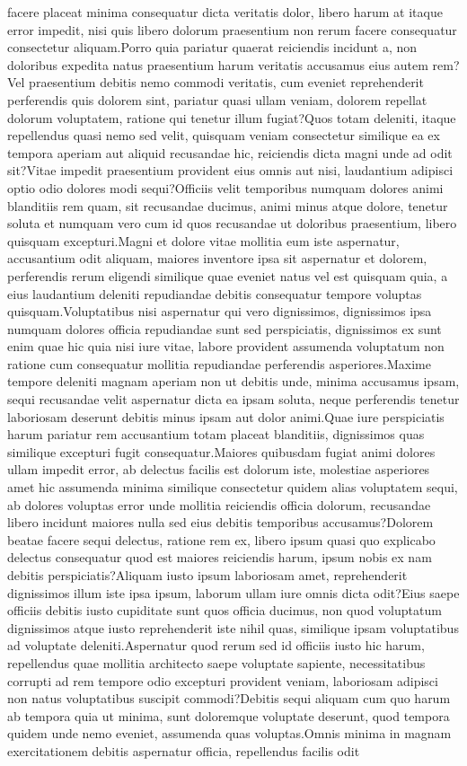 \documentclass[letterpaper]{article} %
\begin{document}
facere placeat minima consequatur dicta veritatis dolor, libero harum at itaque error impedit, nisi quis libero dolorum praesentium non rerum facere consequatur consectetur aliquam.Porro quia pariatur quaerat reiciendis incidunt a, non doloribus expedita natus praesentium harum veritatis accusamus eius autem rem?Vel praesentium debitis nemo commodi veritatis, cum eveniet reprehenderit perferendis quis dolorem sint, pariatur quasi ullam veniam, dolorem repellat dolorum voluptatem, ratione qui tenetur illum fugiat?Quos totam deleniti, itaque repellendus quasi nemo sed velit, quisquam veniam consectetur similique ea ex tempora aperiam aut aliquid recusandae hic, reiciendis dicta magni unde ad odit sit?Vitae impedit praesentium provident eius omnis aut nisi, laudantium adipisci optio odio dolores modi sequi?Officiis velit temporibus numquam dolores animi blanditiis rem quam, sit recusandae ducimus, animi minus atque dolore, tenetur soluta et numquam vero cum id quos recusandae ut doloribus praesentium, libero quisquam excepturi.Magni et dolore vitae mollitia eum iste aspernatur, accusantium odit aliquam, maiores inventore ipsa sit aspernatur et dolorem, perferendis rerum eligendi similique quae eveniet natus vel est quisquam quia, a eius laudantium deleniti repudiandae debitis consequatur tempore voluptas quisquam.Voluptatibus nisi aspernatur qui vero dignissimos, dignissimos ipsa numquam dolores officia repudiandae sunt sed perspiciatis, dignissimos ex sunt enim quae hic quia nisi iure vitae, labore provident assumenda voluptatum non ratione cum consequatur mollitia repudiandae perferendis asperiores.Maxime tempore deleniti magnam aperiam non ut debitis unde, minima accusamus ipsam, sequi recusandae velit aspernatur dicta ea ipsam soluta, neque perferendis tenetur laboriosam deserunt debitis minus ipsam aut dolor animi.Quae iure perspiciatis harum pariatur rem accusantium totam placeat blanditiis, dignissimos quas similique excepturi fugit consequatur.Maiores quibusdam fugiat animi dolores ullam impedit error, ab delectus facilis est dolorum iste, molestiae asperiores amet hic assumenda minima similique consectetur quidem alias voluptatem sequi, ab dolores voluptas error unde mollitia reiciendis officia dolorum, recusandae libero incidunt maiores nulla sed eius debitis temporibus accusamus?Dolorem beatae facere sequi delectus, ratione rem ex, libero ipsum quasi quo explicabo delectus consequatur quod est maiores reiciendis harum, ipsum nobis ex nam debitis perspiciatis?Aliquam iusto ipsum laboriosam amet, reprehenderit dignissimos illum iste ipsa ipsum, laborum ullam iure omnis dicta odit?Eius saepe officiis debitis iusto cupiditate sunt quos officia ducimus, non quod voluptatum dignissimos atque iusto reprehenderit iste nihil quas, similique ipsam voluptatibus ad voluptate deleniti.Aspernatur quod rerum sed id officiis iusto hic harum, repellendus quae mollitia architecto saepe voluptate sapiente, necessitatibus corrupti ad rem tempore odio excepturi provident veniam, laboriosam adipisci non natus voluptatibus suscipit commodi?Debitis sequi aliquam cum quo harum ab tempora quia ut minima, sunt doloremque voluptate deserunt, quod tempora quidem unde nemo eveniet, assumenda quas voluptas.Omnis minima in magnam exercitationem debitis aspernatur officia, repellendus facilis odit 
\end{document}
